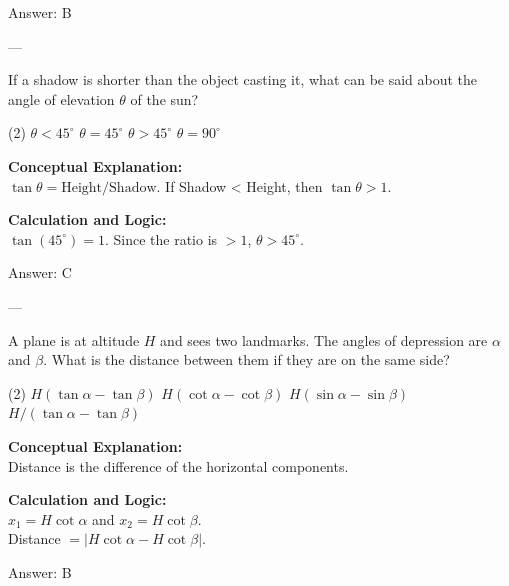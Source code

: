 \documentclass[11pt,paper=a4,answers]{exam}
\begin{document}
\begin{questions}
\begin{solution}
\vspace{15pt}
Answer: \colorbox{yellow!100}{B}
\end{solution}

---

\question
If a shadow is shorter than the object casting it, what can be said about the angle of elevation $\theta$ of the sun?
\begin{tasks}(2)
    \task $\theta < 45^\circ$
    \task $\theta = 45^\circ$
    \task $\theta > 45^\circ$
    \task $\theta = 90^\circ$
\end{tasks}

\begin{solution}
\textbf{Conceptual Explanation:} \\
$\tan \theta = \text{Height} / \text{Shadow}$. If Shadow < Height, then $\tan \theta > 1$.

\vspace{10pt}
\textbf{Calculation and Logic:} \\
$\tan(45^\circ) = 1$. Since the ratio is $> 1$, $\theta > 45^\circ$.

\vspace{15pt}
Answer: \colorbox{yellow!100}{C}
\end{solution}

---

\question
A plane is at altitude $H$ and sees two landmarks. The angles of depression are $\alpha$ and $\beta$. What is the distance between them if they are on the same side?
\begin{tasks}(2)
    \task $H(\tan \alpha - \tan \beta)$
    \task $H(\cot \alpha - \cot \beta)$
    \task $H(\sin \alpha - \sin \beta)$
    \task $H / (\tan \alpha - \tan \beta)$
\end{tasks}

\begin{solution}
\textbf{Conceptual Explanation:} \\
Distance is the difference of the horizontal components.

\vspace{10pt}
\textbf{Calculation and Logic:} \\
$x_1 = H \cot \alpha$ and $x_2 = H \cot \beta$. \\
Distance $= |H \cot \alpha - H \cot \beta|$.

\vspace{15pt}
Answer: \colorbox{yellow!100}{B}
\end{solution}


\end{questions}
\end{document}

